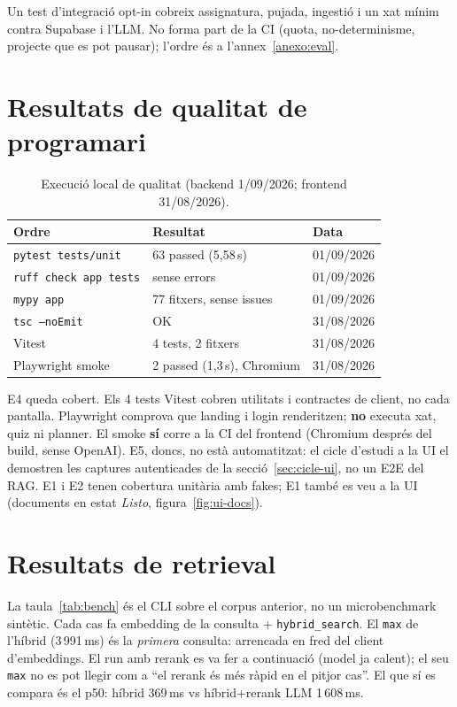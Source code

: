 Un test d'integració opt-in cobreix assignatura, pujada, ingestió i un xat mínim contra Supabase i l'LLM. No forma part de la CI (quota, no-determinisme, projecte que es pot pausar); l'ordre és a l'annex~\ref{anexo:eval}.

\section{Resultats de qualitat de programari}

\begin{table}[htbp]
\centering
\caption{Execució local de qualitat (backend 1/09/2026; frontend 31/08/2026).}
\label{tab:calidad}
\begin{tabular}{lll}
\toprule
Ordre & Resultat & Data \\
\midrule
\texttt{pytest tests/unit} & 63 passed (5,58\,s) & 01/09/2026 \\
\texttt{ruff check app tests} & sense errors & 01/09/2026 \\
\texttt{mypy app} & 77 fitxers, sense issues & 01/09/2026 \\
\texttt{tsc --noEmit} & OK & 31/08/2026 \\
Vitest & 4 tests, 2 fitxers & 31/08/2026 \\
Playwright smoke & 2 passed (1,3\,s), Chromium & 31/08/2026 \\
\bottomrule
\end{tabular}
\end{table}

E4 queda cobert. Els 4 tests Vitest cobren utilitats i contractes de client, no cada pantalla. Playwright comprova que landing i login renderitzen; \textbf{no} executa xat, quiz ni planner. El smoke \textbf{sí} corre a la CI del frontend (Chromium després del build, sense OpenAI). E5, doncs, no està automatitzat: el cicle d'estudi a la UI el demostren les captures autenticades de la secció~\ref{sec:cicle-ui}, no un E2E del RAG. E1 i E2 tenen cobertura unitària amb fakes; E1 també es veu a la UI (documents en estat \emph{Listo}, figura~\ref{fig:ui-docs}).

\section{Resultats de retrieval}

La taula~\ref{tab:bench} és el CLI sobre el corpus anterior, no un microbenchmark sintètic. Cada cas fa embedding de la consulta + \texttt{hybrid\_search}. El \texttt{max} de l'híbrid (3\,991\,ms) és la \emph{primera} consulta: arrencada en fred del client d'embeddings. El run amb rerank es va fer a continuació (model ja calent); el seu \texttt{max} no es pot llegir com a ``el rerank és més ràpid en el pitjor cas''. El que sí es compara és el p50: híbrid 369\,ms vs híbrid+rerank LLM 1\,608\,ms.

